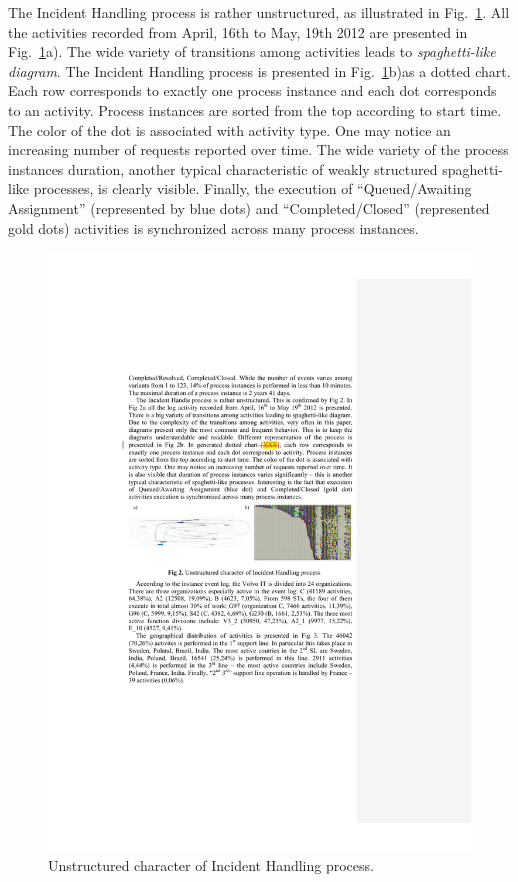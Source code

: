 \documentclass[lnbip]{svmultln}
\begin{document}
The Incident Handling process is rather unstructured, as illustrated in Fig.~\ref{fig:unstructuredHandleInstanceProcess}. All the activities recorded from April, 16th to May, 19th 2012 are presented in Fig.~\ref{fig:unstructuredHandleInstanceProcess}a). The wide variety of transitions among activities leads to \emph{spaghetti-like diagram}. The Incident Handling process is presented in Fig.~\ref{fig:unstructuredHandleInstanceProcess}b)as a dotted chart. Each row corresponds to exactly one process instance and each dot corresponds to an activity. Process instances are sorted from the top according to start time. The color of the dot is associated with activity type. One may notice an increasing number of requests reported over time. The wide variety of the process instances duration, another typical characteristic of weakly structured spaghetti-like processes,  is clearly visible. Finally, the execution of ``Queued/Awaiting Assignment'' (represented by blue dots) and ``Completed/Closed'' (represented gold dots) activities is synchronized across many process instances.

\begin{figure}
\centering
\includegraphics[width=\textwidth]{"figs/pic 2"}
\caption{Unstructured character of Incident Handling process.}
\label{fig:unstructuredHandleInstanceProcess}
\end{figure}
\end{document}
